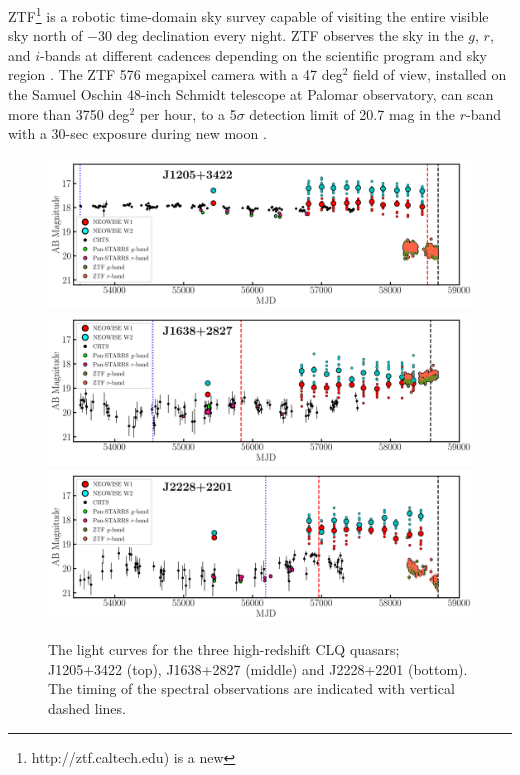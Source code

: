 \documentclass[fleqn,usenatbib]{mnras}
\begin{document}
ZTF\footnote{http://ztf.caltech.edu) is a new} is a robotic 
time-domain sky survey capable of visiting the entire visible sky
north of $-$30 deg declination every night. ZTF observes the sky in
the $g$, $r$, and $i$-bands at different cadences depending on the
scientific program and sky region \citep{Bellm2019_ZTFSurveys,
Graham2019_ZTF}. The ZTF 576 megapixel camera with a 47 deg$^{2}$
field of view, installed on the Samuel Oschin 48-inch Schmidt
telescope at Palomar observatory, can scan more than 3750 deg$^{2}$
per hour, to a 5$\sigma$ detection limit of 20.7 mag in the $r$-band
with a 30-sec exposure during new moon \citep{Masci2019}.
\begin{figure}
  \centering
  \includegraphics[width=16.7cm, trim=0.3cm 0.05cm 0.20cm 0.1cm, clip]
  {figures/J1205+3422_landscape_LC.png}
  \includegraphics[width=16.7cm, trim=0.3cm 0.05cm 0.20cm 0.1cm, clip]
  {figures/J1638+2827_landscape_LC.png}
  \includegraphics[width=16.7cm, trim=0.3cm 0.0cm  0.20cm 0.1cm, clip]
  {figures/J2228+2201_landscape_LC.png}
  \vspace{-6pt}
  \caption[]{The light curves for the three high-redshift CLQ quasars; 
    J1205+3422 (top), 
    J1638+2827 (middle) and  
    J2228+2201 (bottom). 
    The timing of the spectral observations are indicated with vertical dashed lines.}
  \label{fig:civ_clqs_LCs}
\end{figure}
\end{document}
